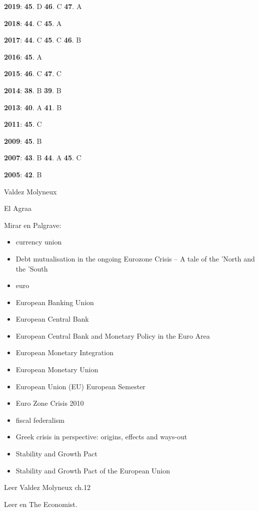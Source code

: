 \documentclass{nuevotema}
\begin{document}
\notas

\textbf{2019}: \textbf{45}. D \textbf{46}. C \textbf{47}. A 

\textbf{2018}: \textbf{44}. C \textbf{45}. A

\textbf{2017}: \textbf{44}. C \textbf{45}. C \textbf{46}. B

\textbf{2016}: \textbf{45}. A

\textbf{2015}: \textbf{46}. C \textbf{47}. C

\textbf{2014}: \textbf{38}. B \textbf{39}. B

\textbf{2013}: \textbf{40}. A \textbf{41}. B

\textbf{2011}: \textbf{45}. C

\textbf{2009}: \textbf{45}. B

\textbf{2007}: \textbf{43}. B \textbf{44}. A \textbf{45}. C

\textbf{2005}: \textbf{42}. B

\bibliografia

Valdez Molyneux

El Agraa

Mirar en Palgrave:
\begin{itemize}
    \item currency union
    \item Debt mutualisation in the ongoing Eurozone Crisis -- A tale of the 'North and the 'South
    \item euro
	\item European Banking Union
	\item European Central Bank
	\item European Central Bank and Monetary Policy in the Euro Area
	\item European Monetary Integration
	\item European Monetary Union
	\item European Union (EU) European Semester
	\item Euro Zone Crisis 2010
	\item fiscal federalism
	\item Greek crisis in perspective: origins, effects and ways-out
	\item Stability and Growth Pact
	\item Stability and Growth Pact of the European Union
\end{itemize}

Leer Valdez Molyneux ch.12 

Leer  en The Economist.
\end{document}
